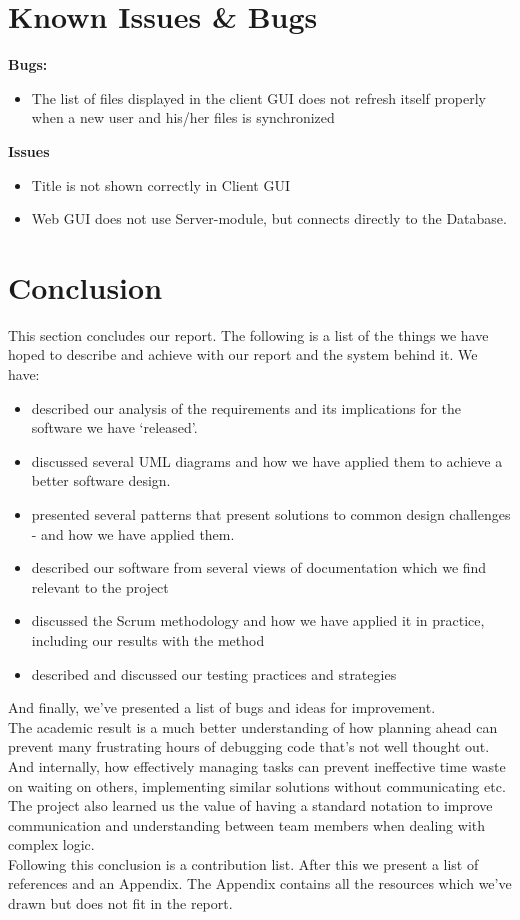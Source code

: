 \section{Known Issues \& Bugs}
\textbf{Bugs:}
\begin{itemize}
\item The list of files displayed in the client GUI does not refresh itself properly when a new user and his/her files is synchronized\\
\end{itemize}
\textbf{Issues}
\begin{itemize}
\item Title is not shown correctly in Client GUI
\item Web GUI does not use Server-module, but connects directly to the Database.
\end{itemize}
\section{Conclusion}
This section concludes our report. The following is a list of the things we have hoped to describe and achieve with our report and the system behind it. We have:
\begin{itemize}
\item described our analysis of the requirements and its implications for the software we have `released'. 
\item discussed several UML diagrams and how we have applied them to achieve a better software design. 
\item presented several patterns that present solutions to common design challenges - and how we have applied them. 
\item described our software from several views of documentation which we find relevant to the project
\item discussed the Scrum methodology and how we have applied it in practice, including our results with the method
\item described and discussed our testing practices and strategies
\end{itemize}
And finally, we've presented a list of bugs and ideas for improvement.\\
The academic result is a much better understanding of how planning ahead can prevent many frustrating hours of debugging code that's not well thought out. And internally, how effectively managing tasks can prevent ineffective time waste on waiting on others, implementing similar solutions without communicating etc. The project also learned us the value of having a standard notation to improve communication and understanding between team members when dealing with complex logic.\\
Following this conclusion is a contribution list. After this we present a list of references and an Appendix. The Appendix contains all the resources which we've drawn but does not fit in the report.\\
\newpage